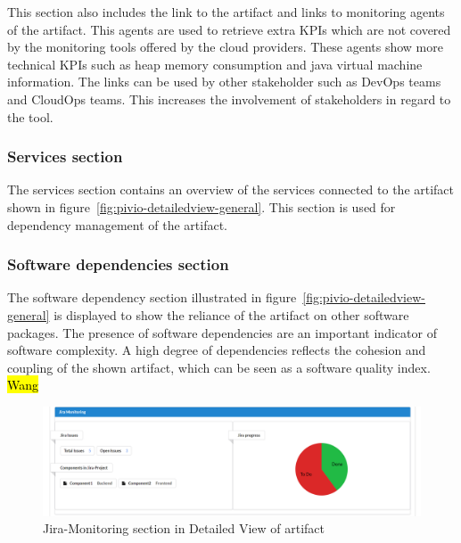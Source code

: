 This section also includes the link to the artifact and links to monitoring agents of the artifact. This agents are used to retrieve extra KPIs which are not covered by the monitoring tools offered by the cloud providers. 
These agents show more technical KPIs such as heap memory consumption and java virtual machine information.
The links can be used by other stakeholder such as DevOps teams and CloudOps teams. This increases the involvement of stakeholders in regard to the tool.

\subsubsection{Services section}\label{subsubsection:servicessection}

The services section contains an overview of the services connected to the artifact shown in figure~\ref{fig:pivio-detailedview-general}. This section is used for dependency management of the artifact.

\subsubsection{Software dependencies section}\label{subsubsection:softwaredependenciessection}

The software dependency section illustrated in figure~\ref{fig:pivio-detailedview-general} is displayed to show the reliance of the artifact on other software packages. The presence of software dependencies are an important indicator of software complexity. 
A high degree of dependencies reflects the cohesion and coupling of the shown artifact, which can be seen as a software quality index. \hl{Wang}


\begin{figure}[htpb]
  \centering
  \includegraphics[width=1.0\textwidth]{figures/pivio-detailview-jira.PNG} \caption{Jira-Monitoring section in Detailed View of artifact}
  \label{fig:pivio-detailedview-jira}
\end{figure}

